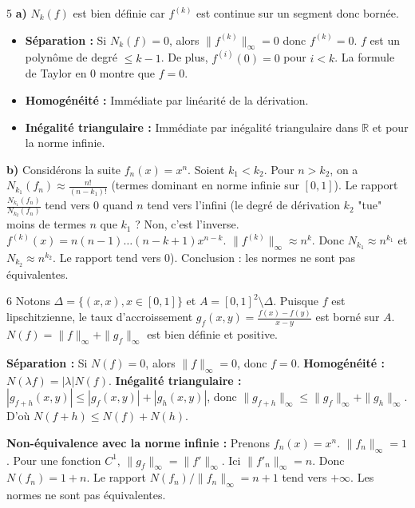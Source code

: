 \begin{correction}{5}
\textbf{a)} $N_k(f)$ est bien définie car $f^{(k)}$ est continue sur un segment donc bornée.
\begin{itemize}
    \item \textbf{Séparation :} Si $N_k(f) = 0$, alors $\|f^{(k)}\|_\infty = 0$ donc $f^{(k)} = 0$. $f$ est un polynôme de degré $\le k-1$. De plus, $f^{(i)}(0) = 0$ pour $i < k$. La formule de Taylor en 0 montre que $f=0$.
    \item \textbf{Homogénéité :} Immédiate par linéarité de la dérivation.
    \item \textbf{Inégalité triangulaire :} Immédiate par inégalité triangulaire dans $\mathbb{R}$ et pour la norme infinie.
\end{itemize}

\textbf{b)} Considérons la suite $f_n(x) = x^n$.
Soient $k_1 < k_2$. Pour $n > k_2$, on a $N_{k_1}(f_n) \approx \frac{n!}{(n-k_1)!}$ (termes dominant en norme infinie sur $[0,1]$).
Le rapport $\frac{N_{k_1}(f_n)}{N_{k_2}(f_n)}$ tend vers 0 quand $n$ tend vers l'infini (le degré de dérivation $k_2$ "tue" moins de termes $n$ que $k_1$ ? Non, c'est l'inverse. $f^{(k)}(x) = n(n-1)\dots(n-k+1)x^{n-k}$. $\|f^{(k)}\|_\infty \approx n^k$. Donc $N_{k_1} \approx n^{k_1}$ et $N_{k_2} \approx n^{k_2}$. Le rapport tend vers 0).
Conclusion : les normes ne sont pas équivalentes.
\end{correction}

\begin{correction}{6}
Notons $\Delta = \{(x,x), x \in [0,1]\}$ et $A = [0,1]^2 \setminus \Delta$.
Puisque $f$ est lipschitzienne, le taux d'accroissement $g_f(x,y) = \frac{f(x)-f(y)}{x-y}$ est borné sur $A$.
$N(f) = \|f\|_\infty + \|g_f\|_\infty$ est bien définie et positive.

\textbf{Séparation :} Si $N(f)=0$, alors $\|f\|_\infty = 0$, donc $f=0$.
\textbf{Homogénéité :} $N(\lambda f) = |\lambda| N(f)$.
\textbf{Inégalité triangulaire :} $|g_{f+h}(x,y)| \le |g_f(x,y)| + |g_h(x,y)|$, donc $\|g_{f+h}\|_\infty \le \|g_f\|_\infty + \|g_h\|_\infty$. D'où $N(f+h) \le N(f) + N(h)$.

\textbf{Non-équivalence avec la norme infinie :}
Prenons $f_n(x) = x^n$. $\|f_n\|_\infty = 1$.
Pour une fonction $C^1$, $\|g_f\|_\infty = \|f'\|_\infty$. Ici $\|f'_n\|_\infty = n$.
Donc $N(f_n) = 1 + n$.
Le rapport $N(f_n) / \|f_n\|_\infty = n+1$ tend vers $+\infty$. Les normes ne sont pas équivalentes.
\end{correction}

